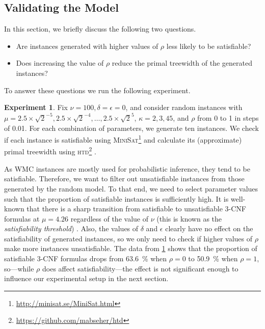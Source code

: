 \documentclass{article}
\theoremstyle{definition}
\newtheorem{experiment}{Experiment}
\theoremstyle{remark}
\begin{document}
\subsection{Validating the Model} \label{sec:remarks}

In this section, we briefly discuss the following two questions.
\begin{itemize}
\item Are instances generated with higher values of $\rho$ less likely to be
  satisfiable?
\item Does increasing the value of $\rho$ reduce the primal treewidth of the
  generated instances?
\end{itemize}
To answer these questions we run the following experiment.

\begin{experiment} \label{exp:regular_satisfiability}
  Fix $\nu = 100, \delta = \epsilon = 0$, and consider random instances with
  $\mu = 2.5 \times \sqrt{2}^{-5}, 2.5 \times \sqrt{2}^{-4}, \dots, 2.5 \times
  \sqrt{2}^5$, $\kappa = 2, 3, 4 5$, and $\rho$ from 0 to 1 in steps of
  0.01. For each combination of parameters, we generate ten instances. We check
  if each instance is satisfiable using
  \textsc{MiniSat}\footnote{\url{http://minisat.se/MiniSat.html}}
  \cite{DBLP:conf/sat/EenS03} and calculate its (approximate) primal treewidth
  using \textsc{htd}\footnote{\url{https://github.com/mabseher/htd}}
  \cite{DBLP:conf/cpaior/AbseherMW17}.
\end{experiment}

As \textsf{WMC} instances are mostly used for probabilistic inference, they tend
to be satisfiable. Therefore, we want to filter out unsatisfiable instances from
those generated by the random model. To that end, we need to select parameter
values such that the proportion of satisfiable instances is sufficiently high.
It is well-known that there is a sharp transition from satisfiable to
unsatisfiable 3-CNF formulas at $\mu = 4.26$ regardless of the value of $\nu$
(this is known as the \emph{satisfiability threshold})
\cite{DBLP:journals/ai/CrawfordA96}. Also, the values of $\delta$ and $\epsilon$
clearly have no effect on the satisfiability of generated instances, so we only
need to check if higher values of $\rho$ make more instances unsatisfiable. The
data from \cref{exp:regular_satisfiability} shows that the proportion of
satisfiable 3-CNF formulas drops from \SI{63.6}{\percent} when $\rho = 0$ to
\SI{50.9}{\percent} when $\rho = 1$, so---while $\rho$ does affect
satisfiability---the effect is not significant enough to influence our
experimental setup in the next section.
\end{document}
